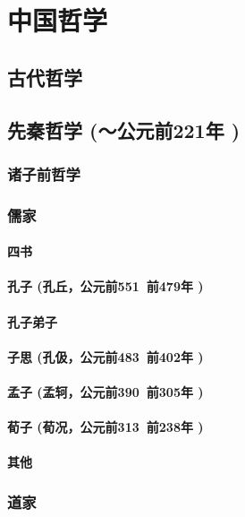 \documentclass[UTF8]{../RepresentationUniverse}
\begin{document}
\section{中国哲学}
        
\subsection{古代哲学}

\subsection{先秦哲学 (～公元前221年 )}
    \subsubsection{诸子前哲学}
    
    \subsubsection{儒家}
        \paragraph{四书}
        \paragraph{孔子 (孔丘，公元前551~前479年 )}
        \paragraph{孔子弟子}
        \paragraph{子思 (孔伋，公元前483~前402年 )}
        \paragraph{孟子 (孟轲，公元前390~前305年 )}
        \paragraph{荀子 (荀况，公元前313~前238年 )}
        \paragraph{其他}

    \subsubsection{道家}
\end{document}
